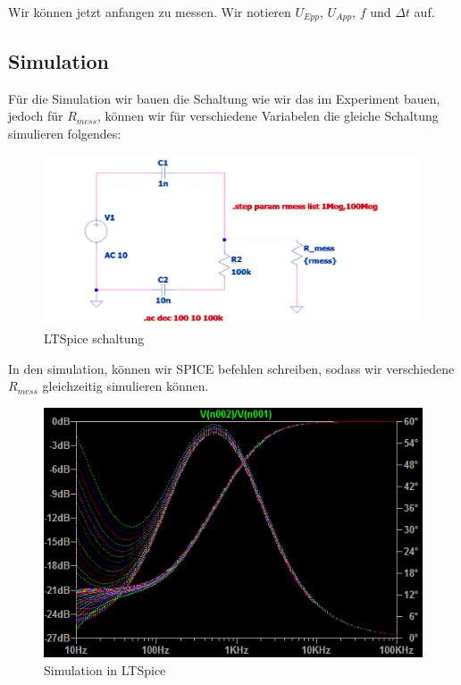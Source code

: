 Wir können jetzt anfangen zu messen. Wir notieren $U_{Epp}$, $U_{App}$, $f$ und $\Delta t$ auf.
%
%
%
\begin{flushright}
  \textit{\autorA}
\end{flushright}
%
%
%
%
\subsection{Simulation}
\label{subsec:3_Simulation}
%
%
Für die Simulation wir bauen die Schaltung wie wir das im Experiment bauen, jedoch für $R_{mess}$, können wir für verschiedene Variabelen die gleiche Schaltung simulieren folgendes:
\begin{figure}[H]
  \centering
  \includegraphics[scale=.4]{src/ltspice2.png}
  \caption{LTSpice schaltung}
  \label{fig:Schaltung von LTSpice}
\end{figure}
%
In den simulation, können wir SPICE befehlen schreiben, sodass wir verschiedene $R_{mess}$ gleichzeitig simulieren können.
\begin{figure}[H]
  \centering
  \includegraphics[scale=1]{src/ltspice5.png}
  \caption{Simulation in LTSpice}
  \label{fig:LTSpice simulation}
\end{figure}
%
%
\begin{flushright}
  \textit{\autorA}
\end{flushright}
%
%
%
%